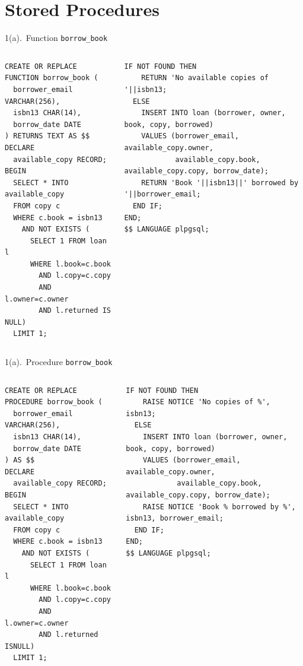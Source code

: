 \documentclass{beamer}
\begin{document}
\section{Stored Procedures}
\begin{frame}[fragile]{1(a).\ Function \texttt{borrow\_book}}
\vspace{-0.3em}
\begin{columns}[t,onlytextwidth]
\begin{lstlisting}[numbers=none]
CREATE OR REPLACE FUNCTION borrow_book (
  borrower_email VARCHAR(256),
  isbn13 CHAR(14),
  borrow_date DATE
) RETURNS TEXT AS $$
DECLARE
  available_copy RECORD;
BEGIN
  SELECT * INTO available_copy
  FROM copy c
  WHERE c.book = isbn13
    AND NOT EXISTS (
      SELECT 1 FROM loan l
      WHERE l.book=c.book
        AND l.copy=c.copy
        AND l.owner=c.owner
        AND l.returned IS NULL)
  LIMIT 1;
\end{lstlisting}

\begin{lstlisting}[numbers=none]
  IF NOT FOUND THEN
    RETURN 'No available copies of '||isbn13;
  ELSE
    INSERT INTO loan (borrower, owner, book, copy, borrowed)
    VALUES (borrower_email, available_copy.owner,
            available_copy.book, available_copy.copy, borrow_date);
    RETURN 'Book '||isbn13||' borrowed by '||borrower_email;
  END IF;
END;
$$ LANGUAGE plpgsql;
\end{lstlisting}
\end{columns}
\end{frame}

\begin{frame}[fragile]{1(a).\ Procedure \texttt{borrow\_book}}
\vspace{-0.3em}
\begin{columns}[t,onlytextwidth]
\begin{lstlisting}[numbers=none]
CREATE OR REPLACE PROCEDURE borrow_book (
  borrower_email VARCHAR(256),
  isbn13 CHAR(14),
  borrow_date DATE
) AS $$
DECLARE
  available_copy RECORD;
BEGIN
  SELECT * INTO available_copy
  FROM copy c
  WHERE c.book = isbn13
    AND NOT EXISTS (
      SELECT 1 FROM loan l
      WHERE l.book=c.book
        AND l.copy=c.copy
        AND l.owner=c.owner
        AND l.returned ISNULL)
  LIMIT 1;
\end{lstlisting}

\begin{lstlisting}[numbers=none]
  IF NOT FOUND THEN
    RAISE NOTICE 'No copies of %', isbn13;
  ELSE
    INSERT INTO loan (borrower, owner, book, copy, borrowed)
    VALUES (borrower_email, available_copy.owner,
            available_copy.book, available_copy.copy, borrow_date);
    RAISE NOTICE 'Book % borrowed by %', isbn13, borrower_email;
  END IF;
END;
$$ LANGUAGE plpgsql;
\end{lstlisting}
\end{columns}
\end{frame}
\end{document}
